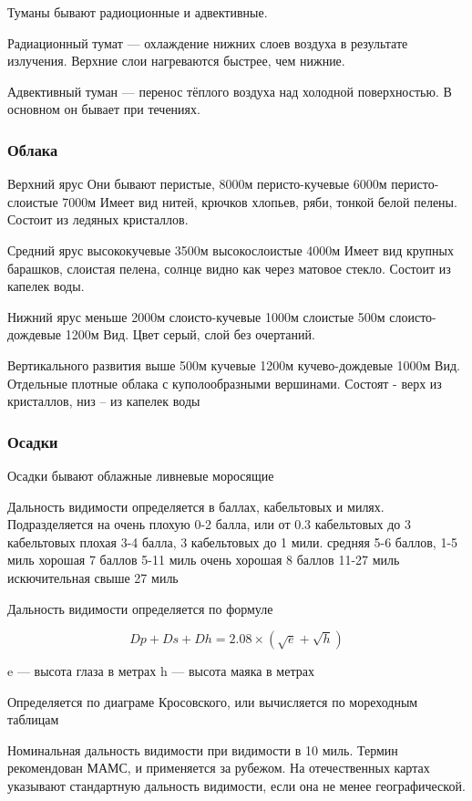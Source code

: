\documentclass{article}        %
\begin{document}
Туманы бывают радиоционные и адвективные.

Радиационный тумат --- охлаждение нижних слоев воздуха в результате излучения. Верхние слои нагреваются быстрее, чем нижние.

Адвективный туман --- перенос тёплого воздуха над холодной поверхностью. В основном он бывает при течениях.

\subsubsection{Облака} 
Верхний ярус
	Они бывают перистые, 8000м
	перисто-кучевые 6000м
	перисто-слоистые 7000м 
	Имеет вид нитей, крючков хлопьев, ряби, тонкой белой пелены.
	Состоит из ледяных кристаллов.

Средний ярус
	высококучевые 3500м
	высокослоистые 4000м
	Имеет вид крупных барашков, слоистая пелена, солнце видно как через матовое стекло. Состоит из капелек воды.

Нижний ярус меньше 2000м 
	слоисто-кучевые 1000м
	слоистые 500м
	слоисто-дождевые 1200м
	Вид. Цвет серый, слой без очертаний. 

Вертикального развития
	выше 500м
	кучевые 1200м
	кучево-дождевые 1000м 
	Вид. Отдельные плотные облака с куполообразными вершинами. Состоят - верх из кристаллов, низ -- из капелек воды

\subsubsection{Осадки}
Осадки бывают 
	облажные
	ливневые
	моросящие

Дальность видимости определяется в баллах, кабельтовых и милях. 
Подразделяется на
	очень плохую 0-2 балла, или от 0.3 кабельтовых до 3 кабельтовых
	плохая 3-4 балла, 3 кабельтовых до 1 мили.
	средняя 5-6 баллов, 1-5 миль
	хорошая 7 баллов 5-11 миль
	очень хорошая 8 баллов 11-27 миль
	искючительная свыше 27 миль



Дальность видимости определяется по формуле

$$ Dp + Ds + Dh = 2.08\times (\sqrt e + \sqrt h) $$

e --- высота глаза в метрах
h --- высота маяка в метрах


Определяется по диаграме Кросовского, или вычисляется по мореходным таблицам

Номинальная дальность видимости при видимости в 10 миль.
Термин рекомендован МАМС, и применяется за рубежом. На отечественных картах указывают стандартную дальность видимости, если она не менее географической. 
\end{document}
